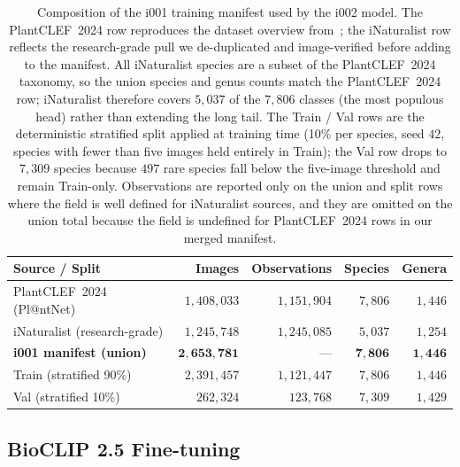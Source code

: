 \begin{table}[ht]
  \centering
  \small
  \setlength{\tabcolsep}{6pt}
  \begin{tabular}{@{}lrrrr@{}}
    \toprule
    Source / Split & Images & Observations & Species & Genera \\
    \midrule
    PlantCLEF~2024 (Pl@ntNet)     & $1{,}408{,}033$ & $1{,}151{,}904$ & $7{,}806$ & $1{,}446$ \\
    iNaturalist (research-grade)  & $1{,}245{,}748$ & $1{,}245{,}085$ & $5{,}037$ & $1{,}254$ \\
    \midrule
    \textbf{i001 manifest (union)}    & $\mathbf{2{,}653{,}781}$ & --- & $\mathbf{7{,}806}$ & $\mathbf{1{,}446}$ \\
    \hspace{1em}Train (stratified 90\%) & $2{,}391{,}457$ & $1{,}121{,}447$ & $7{,}806$ & $1{,}446$ \\
    \hspace{1em}Val (stratified 10\%)   & $262{,}324$     & $123{,}768$     & $7{,}309$ & $1{,}429$ \\
    \bottomrule
  \end{tabular}
  \caption{Composition of the i001 training manifest used by the i002 model. The PlantCLEF~2024 row reproduces the dataset overview from~\cite{joly2024overview}; the iNaturalist row reflects the research-grade pull we de-duplicated and image-verified before adding to the manifest. All iNaturalist species are a subset of the PlantCLEF~2024 taxonomy, so the union species and genus counts match the PlantCLEF~2024 row; iNaturalist therefore covers $5{,}037$ of the $7{,}806$ classes (the most populous head) rather than extending the long tail. The Train / Val rows are the deterministic stratified split applied at training time (10\% per species, seed $42$, species with fewer than five images held entirely in Train); the Val row drops to $7{,}309$ species because $497$ rare species fall below the five-image threshold and remain Train-only. Observations are reported only on the union and split rows where the field is well defined for iNaturalist sources, and they are omitted on the union total because the field is undefined for PlantCLEF~2024 rows in our merged manifest.}
  \label{tab:i001_manifest}
\end{table}

\subsection{BioCLIP 2.5 Fine-tuning}
\label{sec:backbone}

